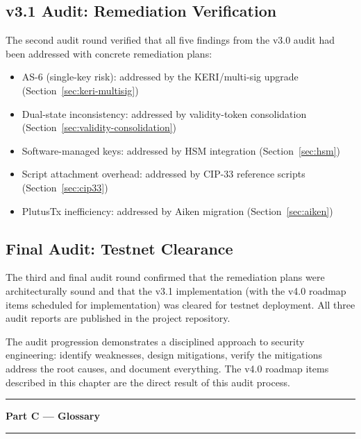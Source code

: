 \subsection{v3.1 Audit: Remediation Verification}

The second audit round verified that all five findings from the v3.0 audit
had been addressed with concrete remediation plans:

\begin{itemize}[nosep]
  \item AS-6 (single-key risk): addressed by the KERI/multi-sig upgrade
    (Section~\ref{sec:keri-multisig})
  \item Dual-state inconsistency: addressed by validity-token consolidation
    (Section~\ref{sec:validity-consolidation})
  \item Software-managed keys: addressed by HSM integration
    (Section~\ref{sec:hsm})
  \item Script attachment overhead: addressed by CIP-33 reference scripts
    (Section~\ref{sec:cip33})
  \item PlutusTx inefficiency: addressed by Aiken migration
    (Section~\ref{sec:aiken})
\end{itemize}

\subsection{Final Audit: Testnet Clearance}

The third and final audit round confirmed that the remediation plans were
architecturally sound and that the v3.1 implementation (with the v4.0
roadmap items scheduled for implementation) was cleared for testnet
deployment.  All three audit reports are published in the project
repository.

The audit progression demonstrates a disciplined approach to security
engineering: identify weaknesses, design mitigations, verify the mitigations
address the root causes, and document everything.  The v4.0 roadmap items
described in this chapter are the direct result of this audit process.



\vspace{1em}
\noindent\rule{\textwidth}{0.8pt}
\begin{center}
  {\Large\sffamily\bfseries Part C --- Glossary}
\end{center}
\noindent\rule{\textwidth}{0.4pt}
\vspace{0.5em}

